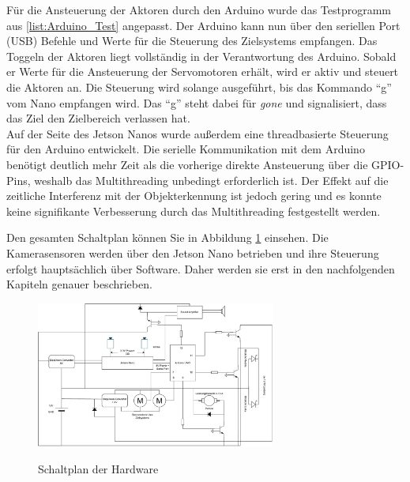 Für die Ansteuerung der Aktoren durch den Arduino wurde das Testprogramm aus \ref{list:Arduino_Test} angepasst. Der Arduino kann nun über den seriellen Port (USB) Befehle und Werte für die Steuerung des Zielsystems empfangen. Das Toggeln der Aktoren liegt vollständig in der Verantwortung des Arduino. Sobald er Werte für die Ansteuerung der Servomotoren erhält, wird er aktiv und steuert die Aktoren an. Die Steuerung wird solange ausgeführt, bis das Kommando "`g"' vom Nano empfangen wird. Das "`g"' steht dabei für \textit{gone} und signalisiert, dass das Ziel den Zielbereich verlassen hat.
\\
Auf der Seite des Jetson Nanos wurde außerdem eine threadbasierte Steuerung für den Arduino entwickelt. Die serielle Kommunikation mit dem Arduino benötigt deutlich mehr Zeit als die vorherige direkte Ansteuerung über die \ac{GPIO}-Pins, weshalb das Multithreading unbedingt erforderlich ist. Der Effekt auf die zeitliche Interferenz mit der Objekterkennung ist jedoch gering und es konnte keine signifikante Verbesserung durch das Multithreading festgestellt werden.

Den gesamten Schaltplan können Sie in Abbildung \ref{diag:all} einsehen. Die Kamerasensoren werden über den Jetson Nano betrieben und ihre Steuerung erfolgt hauptsächlich über Software. Daher werden sie erst in den nachfolgenden Kapiteln genauer beschrieben.

\begin{figure}[H]
    \centering
    \includegraphics[angle=90,width=0.7\textwidth]{images/Schaltskizzen-Seite-3.drawio.pdf}
    \label{diag:all}
    \caption{Schaltplan der Hardware}
\end{figure}
